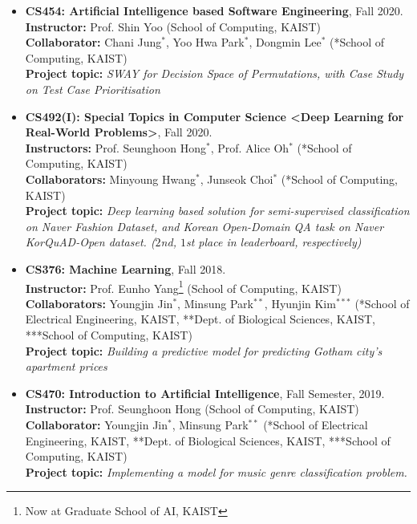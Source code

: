 \documentclass[10pt,a4]{article}
\begin{document}
\begin{small}
\begin{itemize}
	\item {\bf CS454: Artificial Intelligence based Software Engineering}, Fall 2020. \\
	{\bf Instructor:} Prof. Shin Yoo (School of Computing, KAIST) \\
	{\bf Collaborator:} Chani Jung$^{*}$, Yoo Hwa Park$^{*}$, Dongmin Lee$^{*}$ (*School of Computing, KAIST) \\
	{\bf Project topic:} {\it SWAY for Decision Space of Permutations, with Case Study on Test Case Prioritisation} \\
	
	\item {\bf CS492(I): Special Topics in Computer Science <Deep Learning for Real-World Problems>}, Fall 2020. \\
	{\bf Instructors:} Prof. Seunghoon Hong$^{*}$, Prof. Alice Oh$^{*}$ (*School of Computing, KAIST) \\
	{\bf Collaborators:} Minyoung Hwang$^{*}$, Junseok Choi$^{*}$ (*School of Computing, KAIST) \\
	{\bf Project topic:} {\it Deep learning based solution for semi-supervised classification on Naver Fashion Dataset, and Korean Open-Domain QA task on Naver KorQuAD-Open dataset. ($2$nd, $1$st place in leaderboard, respectively)} \\
	
	
	\item {\bf CS376: Machine Learning}, Fall 2018. \\
	{\bf Instructor:} Prof. Eunho Yang\footnote{Now at Graduate School of AI, KAIST} (School of Computing, KAIST) \\
	{\bf Collaborators:} Youngjin Jin$^{*}$, Minsung Park$^{**}$, Hyunjin Kim$^{***}$ (*School of Electrical Engineering, KAIST, **Dept. of Biological Sciences, KAIST, ***School of Computing, KAIST) \\
	{\bf Project topic:} {\it Building a predictive model for predicting Gotham city's apartment prices} \\
	
	\item {\bf CS470: Introduction to Artificial Intelligence}, Fall Semester, 2019. \\
	{\bf Instructor:} Prof. Seunghoon Hong (School of Computing, KAIST) \\
	{\bf Collaborator:} Youngjin Jin$^{*}$, Minsung Park$^{**}$ (*School of Electrical Engineering, KAIST, **Dept. of Biological Sciences, KAIST, ***School of Computing, KAIST) \\
	{\bf Project topic:} {\it Implementing a model for music genre classification problem.} \\
%	
	

\end{itemize}
\end{small}
\end{document}
